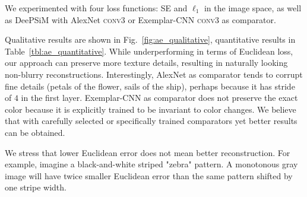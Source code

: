 \documentclass{article}
\newcommand{\conv}{\textsc{conv}}
\newcommand{\ourapproach}{DeePSiM }
\newcommand{\ltwo}{SE }
\newcommand{\lone}{$\ell_1$ }
\begin{document}
We experimented with four loss functions: \ltwo and \lone in the image space, as well as \ourapproach with AlexNet \conv3 or Exemplar-CNN \conv3 as comparator.

Qualitative results are shown in Fig.~\ref{fig:ae_qualitative}, quantitative results in Table~\ref{tbl:ae_quantitative}.
While underperforming in terms of Euclidean loss, our approach can preserve more texture details, resulting in naturally looking non-blurry reconstructions.
Interestingly, AlexNet as comparator tends to corrupt fine details (petals of the flower, sails of the ship), perhaps because it has stride of $4$ in the first layer.
Exemplar-CNN as comparator does not preserve the exact color because it is explicitly trained to be invariant to color changes. 
We believe that with carefully selected or specifically trained comparators yet better results can be obtained.

We stress that lower Euclidean error does not mean better reconstruction.
For example, imagine a black-and-white striped "zebra" pattern.
A monotonous gray image will have twice smaller Euclidean error than the same pattern shifted by one stripe width.
\end{document}
